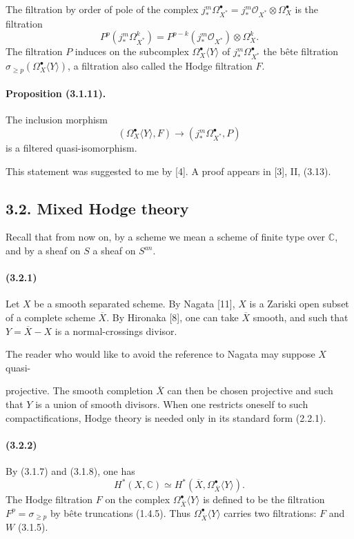\documentclass[10pt]{article}
\newcommand{\C}{\mathbb C}
\providecommand{\cO}{\mathcal O}
\providecommand{\cO}{\mathcal O}
\begin{document}
The filtration by order of pole of the complex $j_*^m\Omega_{X^*}^\bullet=j_*^m\cO_{X^*}\otimes\Omega_X^\bullet$ is the filtration
\[
\tag{3.1.10.2}
P^p(j_*^m\Omega_{X^*}^k)=P^{p-k}(j_*^m\cO_{X^*})\otimes\Omega_X^k.
\]
The filtration $P$ induces on the subcomplex $\Omega_X^\bullet\langle Y\rangle$ of $j_*^m\Omega_{X^*}^\bullet$ the bête filtration $\sigma_{\ge p}(\Omega_X^\bullet\langle Y\rangle)$, a filtration also called the Hodge filtration $F$.

\paragraph{Proposition (3.1.11).} The inclusion morphism
\[
(\Omega_X^\bullet\langle Y\rangle,F)\longrightarrow(j_*^m\Omega_{X^*}^\bullet,P)
\]
is a filtered quasi-isomorphism.

This statement was suggested to me by [4]. A proof appears in [3], II, (3.13).

\subsection*{3.2. Mixed Hodge theory}

Recall that from now on, by a scheme we mean a scheme of finite type over $\C$, and by a sheaf on $S$ a sheaf on $S^{an}$.

\paragraph{(3.2.1)} Let $X$ be a smooth separated scheme. By Nagata [11], $X$ is a Zariski open subset of a complete scheme $\overline X$. By Hironaka [8], one can take $\overline X$ smooth, and such that $Y=\overline X-X$ is a normal-crossings divisor.

The reader who would like to avoid the reference to Nagata may suppose $X$ quasi-



projective. The smooth completion $\overline X$ can then be chosen projective and such that $Y$ is a union of smooth divisors. When one restricts oneself to such compactifications, Hodge theory is needed only in its standard form (2.2.1).

\paragraph{(3.2.2)} By (3.1.7) and (3.1.8), one has
\[
H^*(X,\C)\simeq H^*(\overline X,\Omega_{\overline X}^{\bullet}\langle Y\rangle).
\]
The Hodge filtration $F$ on the complex $\Omega_{\overline X}^{\bullet}\langle Y\rangle$ is defined to be the filtration $F^p=\sigma_{\ge p}$ by bête truncations (1.4.5). Thus $\Omega_{\overline X}^{\bullet}\langle Y\rangle$ carries two filtrations: $F$ and $W$ (3.1.5).
\end{document}

